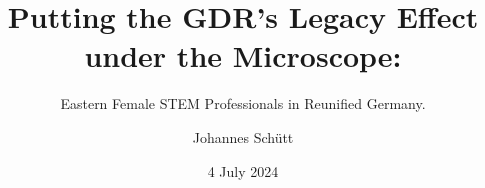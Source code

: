 \documentclass[11pt, aspectratio=1610, xcolor={dvipsnames}]{beamer}
\begin{document}
	
	\title[Putting the GDR's Legacy Effect \linebreak under the Microscope]{Putting the GDR's Legacy Effect \linebreak under the Microscope:}
	\subtitle{Eastern Female STEM Professionals in Reunified Germany.}
	
	\author{Johannes Schütt}
	
	
	\date{4 July 2024}
	
	
	
	
	\begin{frame}[plain]
		\maketitle
	\end{frame}
	
	\begin{frame}
		\frametitle{}
	\end{frame}
\end{document}
